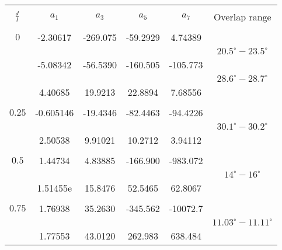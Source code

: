 \begin{table}[!h]

\begin{center}
\setlength{\unitlength}{\textwidth}

\begin{tabular}{c c c c c c} %
\hline\hline %
\\[0.0ex]
$\frac{d}{l}$ & $a_1$ & $a_3$ & $a_5$ & $a_7$ & Overlap range\\ [-0.1ex] %
\hline 

\\[-0.2ex]%
$0$ &  -2.30617 & -269.075 & -59.2929 & 4.74389 &\\[-0.6ex]
    &  &  &  & & $20.5^{\circ}-23.5^{\circ}$\\[-0.8ex]
    & -5.08342 & -56.5390 & -160.505 & -105.773 & \\[0.0ex]
  &  &  &  & & $28.6^{\circ}-28.7^{\circ}$\\[-0.6ex]
    &  4.40685 & 19.9213 & 22.8894 & 7.68556 & \\[0.2ex]


\\[0.8ex]%
$0.25$ & -0.605146 & -19.4346 &-82.4463 & -94.4226\\[0.0ex]
&  &  &  & & $30.1^{\circ}-30.2^{\circ}$\\[-0.4ex]
      & 2.50538 & 9.91021  & 10.2712 & 3.94112 \\[-0.2ex]

 \\[0.8ex]%


 $0.5$ & 1.44734 & 4.83885  & -166.900 & -983.072 \\[0.0ex]%
 &  &  &  & & $14^{\circ}-16^{\circ}$\\[0.0ex]

  & 1.51455e & 15.8476 & 52.5465 & 62.8067 \\ [0.4ex] %
  
  \\[0.8ex]%
  
   $0.75$ & 1.76938 & 35.2630 & -345.562 & -10072.7 \\[-0.4ex]
&  &  &  & & $11.03^{\circ}-11.11^{\circ}$\\[-0.4ex]
          & 1.77553 & 43.0120 & 262.983 & 638.484 \\ [0.2ex]
          

\end{tabular}
\end{center}
\end{table}
